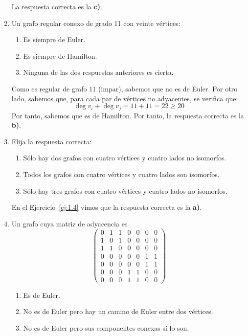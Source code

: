 \begin{ejercicio}
\begin{enumerate}
        La respuesta correcta es la \textbf{c)}.
        \item Un grafo regular conexo de grado 11 con veinte vértices:
        \begin{enumerate}
            \item Es siempre de Euler.
            \item Es siempre de Hamilton.
            \item Ninguna de las dos respuestas anteriores es cierta.
        \end{enumerate}

        Como es regular de grafo $11$ (impar), sabemos que no es de Euler. Por otro lado, sabemos que, para cada par de vértices no adyacentes, se verifica que:
        \begin{equation*}
            \deg v_i + \deg v_j = 11 + 11 = 22 \geq 20
        \end{equation*}
        Por tanto, sabemos que es de Hamilton. Por tanto, la respuesta correcta es la \textbf{b)}.
        \item Elija la respuesta correcta:
        \begin{enumerate}
            \item Sólo hay dos grafos con cuatro vértices y cuatro lados no isomorfos.
            \item Todos los grafos con cuatro vértices y cuatro lados son isomorfos.
            \item Sólo hay tres grafos con cuatro vértices y cuatro lados no isomorfos.
        \end{enumerate}

        En el Ejercicio~\ref{ej:1.4} vimos que la respuesta correcta es la \textbf{a)}.
        \item Un grafo cuya matriz de adyacencia es
        \[
            \begin{pmatrix}
                0 & 1 & 1 & 0 & 0 & 0 & 0 \\
                1 & 0 & 1 & 0 & 0 & 0 & 0 \\
                1 & 1 & 0 & 0 & 0 & 0 & 0 \\
                0 & 0 & 0 & 0 & 0 & 1 & 1 \\
                0 & 0 & 0 & 0 & 0 & 1 & 1 \\
                0 & 0 & 0 & 1 & 1 & 0 & 0 \\
                0 & 0 & 0 & 1 & 1 & 0 & 0
            \end{pmatrix}
        \]
        \begin{enumerate}
            \item Es de Euler.
            \item No es de Euler pero hay un camino de Euler entre dos vértices.
            \item No es de Euler pero sus componentes conexas sí lo son.
        \end{enumerate}


\end{enumerate}
\end{ejercicio}

